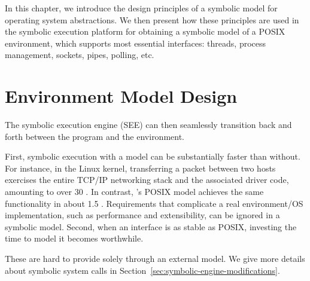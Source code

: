
In this chapter, we introduce the design principles of a symbolic model for operating system abstractions.  We then present how these principles are used in the \cnine symbolic execution platform for obtaining a symbolic model of a POSIX environment, which supports most essential interfaces: threads, process management, sockets, pipes, polling, etc.


\section{Environment Model Design}

  The symbolic execution engine (SEE) can then seamlessly transition back and forth between the program and the environment.

 First, symbolic execution with a model can be substantially faster than without.  For instance, in the Linux kernel, transferring a packet between two hosts exercises the entire TCP/IP networking stack and the associated driver code, amounting to over 30 \kloc.  In contrast, \cnine's POSIX model achieves the same functionality in about 1.5 \kloc. Requirements that complicate a real environment/OS implementation, such as performance and extensibility, can be ignored in a symbolic model. Second, when an interface is as stable as POSIX, investing the time to model it becomes worthwhile.

  These are hard to provide solely through an external model. We give more details about symbolic system calls in Section~\ref{sec:symbolic-engine-modifications}.


